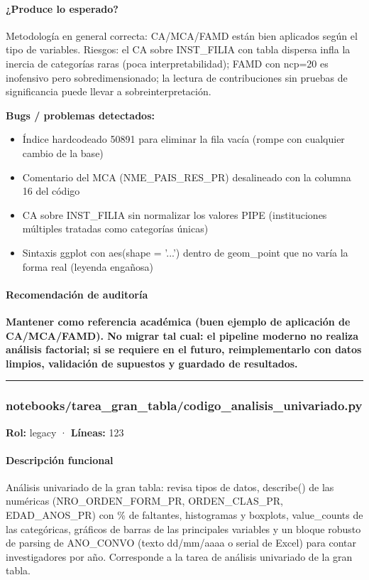 \paragraph{¿Produce lo esperado?}
Metodología en general correcta: CA/MCA/FAMD están bien aplicados según el tipo de variables. Riesgos: el CA sobre INST\_FILIA con tabla dispersa infla la inercia de categorías raras (poca interpretabilidad); FAMD con ncp=20 es inofensivo pero sobredimensionado; la lectura de contribuciones sin pruebas de significancia puede llevar a sobreinterpretación.

\begin{tcolorbox}[riesgo]
\textbf{Bugs / problemas detectados:}
\begin{itemize}
  \item Índice hardcodeado 50891 para eliminar la fila vacía (rompe con cualquier cambio de la base)
  \item Comentario del MCA (NME\_PAIS\_RES\_PR) desalineado con la columna 16 del código
  \item CA sobre INST\_FILIA sin normalizar los valores PIPE (instituciones múltiples tratadas como categorías únicas)
  \item Sintaxis ggplot con aes(shape = '...') dentro de geom\_point que no varía la forma real (leyenda engañosa)
\end{itemize}
\end{tcolorbox}

\paragraph{Recomendación de auditoría}
\textbf{Mantener como referencia académica (buen ejemplo de aplicación de CA/MCA/FAMD). No migrar tal cual: el pipeline moderno no realiza análisis factorial; si se requiere en el futuro, reimplementarlo con datos limpios, validación de supuestos y guardado de resultados.}

\medskip
\hrule

\subsubsection{notebooks/tarea\_gran\_tabla/codigo\_analisis\_univariado.py}
\textbf{Rol:} legacy · \textbf{Líneas:} 123

\paragraph{Descripción funcional}
Análisis univariado de la gran tabla: revisa tipos de datos, describe() de las numéricas (NRO\_ORDEN\_FORM\_PR, ORDEN\_CLAS\_PR, EDAD\_ANOS\_PR) con \% de faltantes, histogramas y boxplots, value\_counts de las categóricas, gráficos de barras de las principales variables y un bloque robusto de parsing de ANO\_CONVO (texto dd/mm/aaaa o serial de Excel) para contar investigadores por año. Corresponde a la tarea de análisis univariado de la gran tabla.

